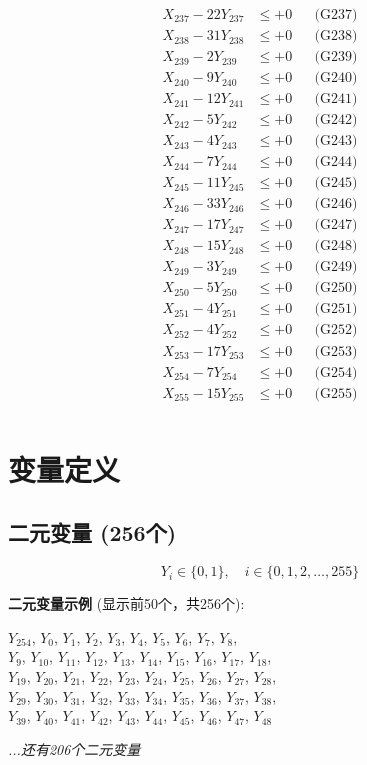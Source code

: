 \documentclass[a4paper,10pt]{article}
\begin{document}
{\begin{align}
X_{237} - 22Y_{237} &\leq +0 && \text{(G237)} \\
X_{238} - 31Y_{238} &\leq +0 && \text{(G238)} \\
X_{239} - 2Y_{239} &\leq +0 && \text{(G239)} \\
X_{240} - 9Y_{240} &\leq +0 && \text{(G240)} \\
X_{241} - 12Y_{241} &\leq +0 && \text{(G241)} \\
X_{242} - 5Y_{242} &\leq +0 && \text{(G242)} \\
X_{243} - 4Y_{243} &\leq +0 && \text{(G243)} \\
\allowbreak
X_{244} - 7Y_{244} &\leq +0 && \text{(G244)} \\
X_{245} - 11Y_{245} &\leq +0 && \text{(G245)} \\
X_{246} - 33Y_{246} &\leq +0 && \text{(G246)} \\
X_{247} - 17Y_{247} &\leq +0 && \text{(G247)} \\
X_{248} - 15Y_{248} &\leq +0 && \text{(G248)} \\
X_{249} - 3Y_{249} &\leq +0 && \text{(G249)} \\
X_{250} - 5Y_{250} &\leq +0 && \text{(G250)} \\
X_{251} - 4Y_{251} &\leq +0 && \text{(G251)} \\
X_{252} - 4Y_{252} &\leq +0 && \text{(G252)} \\
X_{253} - 17Y_{253} &\leq +0 && \text{(G253)} \\
\allowbreak
X_{254} - 7Y_{254} &\leq +0 && \text{(G254)} \\
X_{255} - 15Y_{255} &\leq +0 && \text{(G255)} \\
\end{align}
}

\section{变量定义}

\subsection{二元变量 (256个)}

\begin{equation}
Y_i \in \{0,1\}, \quad i \in \{0, 1, 2, \ldots, 255\}
\end{equation}

\textbf{二元变量示例} (显示前50个，共256个):

{\small
$Y_{254}$, $Y_{0}$, $Y_{1}$, $Y_{2}$, $Y_{3}$, $Y_{4}$, $Y_{5}$, $Y_{6}$, $Y_{7}$, $Y_{8}$, \\
$Y_{9}$, $Y_{10}$, $Y_{11}$, $Y_{12}$, $Y_{13}$, $Y_{14}$, $Y_{15}$, $Y_{16}$, $Y_{17}$, $Y_{18}$, \\
$Y_{19}$, $Y_{20}$, $Y_{21}$, $Y_{22}$, $Y_{23}$, $Y_{24}$, $Y_{25}$, $Y_{26}$, $Y_{27}$, $Y_{28}$, \\
$Y_{29}$, $Y_{30}$, $Y_{31}$, $Y_{32}$, $Y_{33}$, $Y_{34}$, $Y_{35}$, $Y_{36}$, $Y_{37}$, $Y_{38}$, \\
$Y_{39}$, $Y_{40}$, $Y_{41}$, $Y_{42}$, $Y_{43}$, $Y_{44}$, $Y_{45}$, $Y_{46}$, $Y_{47}$, $Y_{48}$

\textit{...还有206个二元变量}
}
\end{document}

